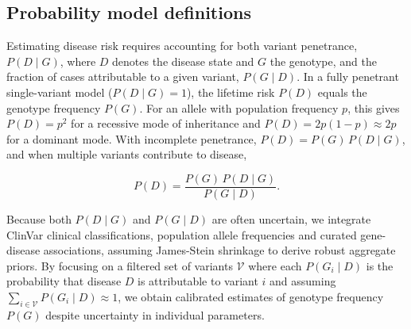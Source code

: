 \subsection{Probability model definitions}
Estimating disease risk requires accounting for both variant penetrance, $P(D\mid G)$, where $D$ denotes the disease state and $G$ the genotype, and the fraction of cases attributable to a given variant, $P(G\mid D)$. In a fully penetrant single-variant model ($P(D\mid G)=1$), the lifetime risk $P(D)$ equals the genotype frequency $P(G)$. For an allele with population frequency $p$, this gives $P(D)=p^2$ for a recessive mode of inheritance and $P(D)=2p(1-p)\approx2p$ for a dominant mode. With incomplete penetrance, $P(D)=P(G)\,P(D\mid G)$, and when multiple variants contribute to disease,  

\[
P(D)=\frac{P(G)\,P(D\mid G)}{P(G\mid D)}.
\]

Because both $P(D\mid G)$ and $P(G\mid D)$ are often uncertain, we integrate ClinVar clinical classifications, population allele frequencies and curated gene-disease associations, assuming James-Stein shrinkage to derive robust aggregate priors. By focusing on a filtered set of variants $\mathcal{V}$ where each $P(G_i\mid D)$ is the probability that disease $D$ is attributable to variant $i$ and assuming $\sum_{i\in\mathcal{V}}P(G_i\mid D)\approx1$, we obtain calibrated estimates of genotype frequency $P(G)$ despite uncertainty in individual parameters. 


\clearpage



\clearpage


